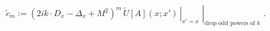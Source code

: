 \begin{equation}
  \label{eq:deftildec}
\tilde c_m := \left. \left . (2 i k \cdot D_x - \Delta_x + M^2)^m
\, \tilde U[A](x;x') \, \right\vert_{x' = x}  \,\,
\right\vert_{\mbox{drop odd powers of $k$}}  \,\,.
\end{equation}

